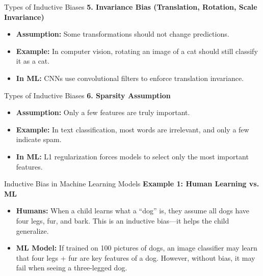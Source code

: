 \documentclass{beamer}
\begin{document}
\begin{frame}{Types of Inductive Biases}
\textbf{5. Invariance Bias (Translation, Rotation, Scale Invariance)}
    \begin{itemize}
        \item \textbf{Assumption:} Some transformations should not change predictions.
        \item \textbf{Example:} In computer vision, rotating an image of a cat should still classify it as a cat.
        \item \textbf{In ML:} CNNs use convolutional filters to enforce translation invariance.
    \end{itemize}
\end{frame} 

\begin{frame}{Types of Inductive Biases}
    \textbf{6. Sparsity Assumption}
    \begin{itemize}
        \item \textbf{Assumption:} Only a few features are truly important.
        \item \textbf{Example:} In text classification, most words are irrelevant, and only a few indicate spam.
        \item \textbf{In ML:} L1 regularization forces models to select only the most important features.
    \end{itemize}
\end{frame}

\begin{frame}{Inductive Bias in Machine Learning Models}
    \textbf{Example 1: Human Learning vs. ML}
    \begin{itemize}
        \item \textbf{Humans:} When a child learns what a “dog” is, they assume all dogs have four legs, fur, and bark. This is an inductive bias—it helps the child generalize.
        \item \textbf{ML Model:} If trained on 100 pictures of dogs, an image classifier may learn that four legs + fur are key features of a dog. However, without bias, it may fail when seeing a three-legged dog.
    \end{itemize}
\end{frame}
\end{document}
